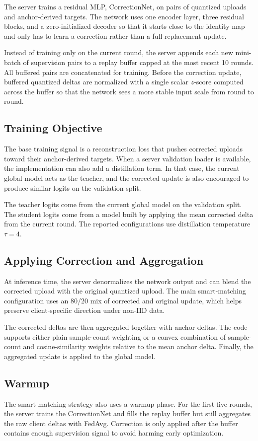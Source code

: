 The server trains a residual MLP, CorrectionNet, on pairs of quantized uploads
and anchor-derived targets. The network uses one encoder layer, three residual
blocks, and a zero-initialized decoder so that it starts close to the identity
map and only has to learn a correction rather than a full replacement update.

Instead of training only on the current round, the server appends each new
mini-batch of supervision pairs to a replay buffer capped at the most recent 10
rounds. All buffered pairs are concatenated for training. Before the correction
update, buffered quantized deltas are normalized with a single scalar
$z$-score computed across the buffer so that the network sees a more stable
input scale from round to round.

\subsection{Training Objective}

The base training signal is a reconstruction loss that pushes corrected uploads
toward their anchor-derived targets. When a server validation loader is
available, the implementation can also add a distillation term. In that case,
the current global model acts as the teacher, and the corrected update is also
encouraged to produce similar logits on the validation split.

The teacher logits come from the current global model on the validation split.
The student logits come from a model built by applying the mean corrected delta
from the current round. The reported configurations use distillation
temperature $\tau=4$.

\subsection{Applying Correction and Aggregation}

At inference time, the server denormalizes the network output and can blend the
corrected upload with the original quantized upload. The main smart-matching
configuration uses an 80/20 mix of corrected and original update, which helps
preserve client-specific direction under non-IID data.

The corrected deltas are then aggregated together with anchor deltas. The code
supports either plain sample-count weighting or a convex combination of
sample-count and cosine-similarity weights relative to the mean anchor delta.
Finally, the aggregated update is applied to the global model.

\subsection{Warmup}

The smart-matching strategy also uses a warmup phase. For the first five rounds,
the server trains the CorrectionNet and fills the replay buffer but still
aggregates the raw client deltas with FedAvg. Correction is only applied after
the buffer contains enough supervision signal to avoid harming early
optimization.
